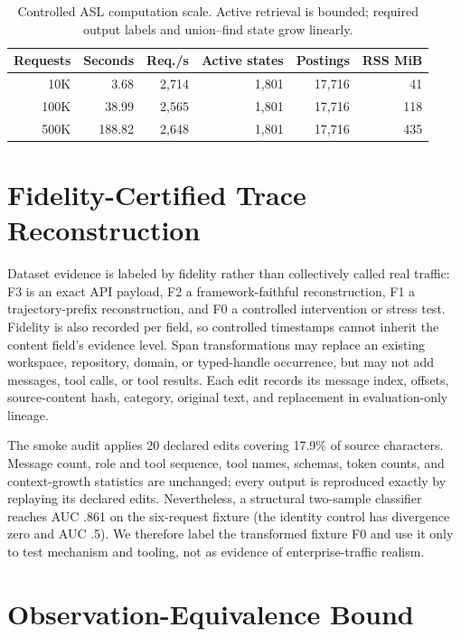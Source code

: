 \documentclass[letterpaper]{article} %
\newcommand{\asl}{\textsc{ASL}\xspace}
\begin{document}
\begin{table}[t]
\centering
\small
\begin{tabular}{@{}rrrrrr@{}}
\toprule
Requests & Seconds & Req./s & Active states & Postings & RSS MiB \\
\midrule
10K & 3.68 & 2,714 & 1,801 & 17,716 & 41 \\
100K & 38.99 & 2,565 & 1,801 & 17,716 & 118 \\
500K & 188.82 & 2,648 & 1,801 & 17,716 & 435 \\
\bottomrule
\end{tabular}
\caption{Controlled \asl computation scale. Active retrieval is bounded; required output labels
and union--find state grow linearly.}
\end{table}

\section{Fidelity-Certified Trace Reconstruction}

Dataset evidence is labeled by fidelity rather than collectively called real traffic: F3 is an
exact API payload, F2 a framework-faithful reconstruction, F1 a trajectory-prefix reconstruction,
and F0 a controlled intervention or stress test. Fidelity is also recorded per field, so controlled
timestamps cannot inherit the content field's evidence level. Span transformations may replace an
existing workspace, repository, domain, or typed-handle occurrence, but may not add messages, tool
calls, or tool results. Each edit records its message index, offsets, source-content hash, category,
original text, and replacement in evaluation-only lineage.

The smoke audit applies 20 declared edits covering 17.9\% of source characters. Message count,
role and tool sequence, tool names, schemas, token counts, and context-growth statistics are
unchanged; every output is reproduced exactly by replaying its declared edits. Nevertheless, a
structural two-sample classifier reaches AUC .861 on the six-request fixture (the identity control
has divergence zero and AUC .5). We therefore label the transformed fixture F0 and use it only to
test mechanism and tooling, not as evidence of enterprise-traffic realism.

\section{Observation-Equivalence Bound}
\end{document}
